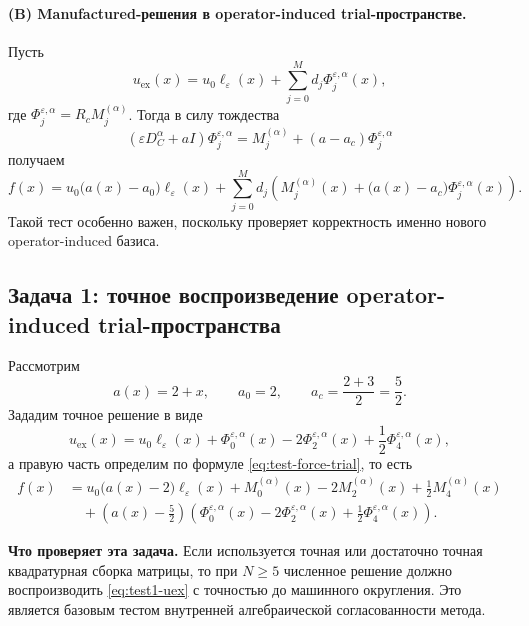 \documentclass[12pt,a4paper]{article}
\theoremstyle{definition}
\newcommand{\eps}{\varepsilon}
\newcommand{\Dc}{D_C^\alpha}
\newcommand{\Rc}{R_c}
\begin{document}
\paragraph{(B) Manufactured-решения в operator-induced trial-пространстве.}
Пусть
\begin{equation}
\label{eq:test-manufactured-trial}
u_{\mathrm{ex}}(x)
=
u_0\ell_\eps(x)+\sum_{j=0}^{M} d_j \Phi_j^{\eps,\alpha}(x),
\end{equation}
где $\Phi_j^{\eps,\alpha}=\Rc M_j^{(\alpha)}$.
Тогда в силу тождества
\[
(\eps \Dc + a I)\Phi_j^{\eps,\alpha}
=
M_j^{(\alpha)} + (a-a_c)\Phi_j^{\eps,\alpha}
\]
получаем
\begin{equation}
\label{eq:test-force-trial}
f(x)
=
u_0\bigl(a(x)-a_0\bigr)\ell_\eps(x)
+
\sum_{j=0}^{M} d_j
\left(
M_j^{(\alpha)}(x)
+
\bigl(a(x)-a_c\bigr)\Phi_j^{\eps,\alpha}(x)
\right).
\end{equation}
Такой тест особенно важен, поскольку проверяет корректность именно нового
operator-induced базиса.

\subsection{Задача 1: точное воспроизведение operator-induced trial-пространства}

Рассмотрим
\[
a(x)=2+x,
\qquad
a_0=2,
\qquad
a_c=\frac{2+3}{2}=\frac52.
\]
Зададим точное решение в виде
\begin{equation}
\label{eq:test1-uex}
u_{\mathrm{ex}}(x)
=
u_0\ell_\eps(x)
+
\Phi_0^{\eps,\alpha}(x)
-2\Phi_2^{\eps,\alpha}(x)
+\frac12 \Phi_4^{\eps,\alpha}(x),
\end{equation}
а правую часть определим по формуле \eqref{eq:test-force-trial}, то есть
\begin{equation}
\label{eq:test1-f}
\begin{aligned}
f(x)
&=
u_0\bigl(a(x)-2\bigr)\ell_\eps(x)
+
M_0^{(\alpha)}(x)-2M_2^{(\alpha)}(x)+\frac12 M_4^{(\alpha)}(x)
\\
&\quad
+
\left(a(x)-\frac52\right)
\left(
\Phi_0^{\eps,\alpha}(x)
-2\Phi_2^{\eps,\alpha}(x)
+\frac12 \Phi_4^{\eps,\alpha}(x)
\right).
\end{aligned}
\end{equation}

\medskip
\noindent
\textbf{Что проверяет эта задача.}
Если используется точная или достаточно точная квадратурная сборка матрицы,
то при $N\ge 5$ численное решение должно воспроизводить \eqref{eq:test1-uex}
с точностью до машинного округления. Это является базовым тестом
внутренней алгебраической согласованности метода.
\end{document}
